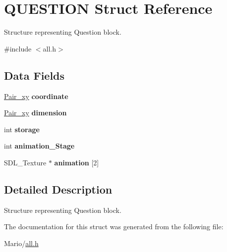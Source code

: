 \hypertarget{struct_q_u_e_s_t_i_o_n}{}\section{Q\+U\+E\+S\+T\+I\+ON Struct Reference}
\label{struct_q_u_e_s_t_i_o_n}


Structure representing Question block.  




{\ttfamily \#include $<$all.\+h$>$}

\subsection*{Data Fields}
\begin{DoxyCompactItemize}
\item 
\mbox{\label{struct_q_u_e_s_t_i_o_n_a6cf77a9254df5cfd669084e0a97d9711}} 
\mbox{\hyperlink{all_8h_a9a35f73dcc6cf9a466e6542847bd8882}{Pair\+\_\+xy}} {\bfseries coordinate}
\item 
\mbox{\label{struct_q_u_e_s_t_i_o_n_a0da7d680eb31a67eac3371518ae0a6cb}} 
\mbox{\hyperlink{all_8h_a9a35f73dcc6cf9a466e6542847bd8882}{Pair\+\_\+xy}} {\bfseries dimension}
\item 
\mbox{\label{struct_q_u_e_s_t_i_o_n_ad6e01e9a269cd7ef6d724e051fb385ef}} 
int {\bfseries storage}
\item 
\mbox{\label{struct_q_u_e_s_t_i_o_n_a6118bdc05fce34a198c8e8d332708235}} 
int {\bfseries animation\+\_\+\+Stage}
\item 
\mbox{\label{struct_q_u_e_s_t_i_o_n_a1fcacba509b1d227e8ed36abf701510b}} 
S\+D\+L\+\_\+\+Texture $\ast$ {\bfseries animation} \mbox{[}2\mbox{]}
\end{DoxyCompactItemize}


\subsection{Detailed Description}
Structure representing Question block. 

The documentation for this struct was generated from the following file\+:\begin{DoxyCompactItemize}
\item 
Mario/\mbox{\hyperlink{all_8h}{all.\+h}}\end{DoxyCompactItemize}
